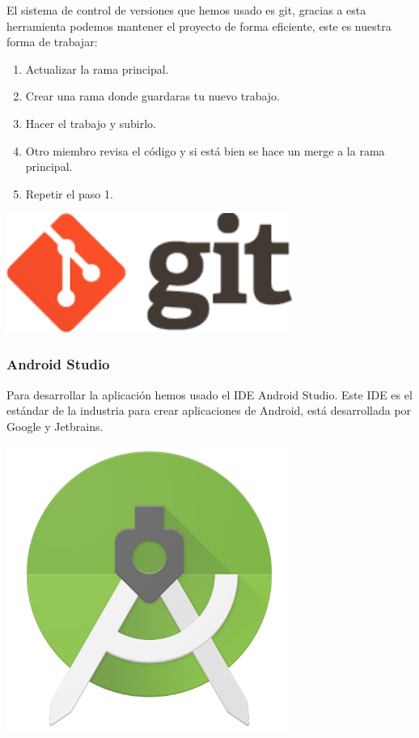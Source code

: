 \documentclass[12pt,a4paper]{article}
\begin{document}
\begin{minipage}{.75\textwidth}
El sistema de control de versiones que hemos usado es git, gracias a esta herramienta podemos mantener el proyecto de forma eficiente, este es nuestra forma de trabajar:

\begin{enumerate}
\item Actualizar la rama principal.
\item Crear una rama donde guardaras tu nuevo trabajo.
\item Hacer el trabajo y subirlo.
\item Otro miembro revisa el código y si está bien se hace un merge a la rama principal.
\item Repetir el paso 1.
\end{enumerate}
\end{minipage} %
\begin{minipage}{.25\textwidth}
  \includegraphics[width=0.7\textwidth, right]{git}
\end{minipage}


\subsubsection{Android Studio}

\begin{minipage}{.75\textwidth}
Para desarrollar la aplicación hemos usado el IDE Android Studio.
Este IDE es el estándar de la industria para crear aplicaciones de Android, está desarrollada por Google y Jetbrains.
\end{minipage} %
\begin{minipage}{.25\textwidth}
  \includegraphics[width=0.7\textwidth, right]{androidstudio}
\end{minipage}
\end{document}
